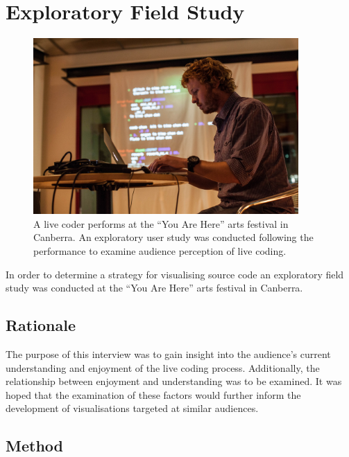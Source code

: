 
\chapter{Exploratory Field Study}
\label{chap:exploratory-field-study}

\begin{figure}
\centering
\includegraphics[width=0.9\textwidth]{../images/study-1-you-are-here-ben.jpg}
\caption{A live coder performs at the ``You Are Here'' arts festival in Canberra. An exploratory user study was conducted following the performance to examine audience perception of live coding.}
\label{fig:exploratory-field-study-ben}
\end{figure}

In order to determine a strategy for visualising source code an exploratory field study was conducted at the ``You Are Here'' arts festival in Canberra.

\section{Rationale}

The purpose of this interview was to gain insight into the audience's current understanding and enjoyment of the live coding process. Additionally, the relationship between enjoyment and understanding was to be examined. It was hoped that the examination of these factors would further inform the development of visualisations targeted at similar audiences.

\section{Method}

